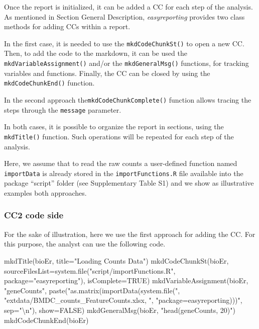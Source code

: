 \documentclass[
]{article}
\newenvironment{Shaded}{\begin{snugshade}}{\end{snugshade}}
\newcommand{\AttributeTok}[1]{\textcolor[rgb]{0.77,0.63,0.00}{#1}}
\newcommand{\ConstantTok}[1]{\textcolor[rgb]{0.00,0.00,0.00}{#1}}
\newcommand{\FunctionTok}[1]{\textcolor[rgb]{0.00,0.00,0.00}{#1}}
\newcommand{\NormalTok}[1]{#1}
\newcommand{\SpecialCharTok}[1]{\textcolor[rgb]{0.00,0.00,0.00}{#1}}
\newcommand{\StringTok}[1]{\textcolor[rgb]{0.31,0.60,0.02}{#1}}
\begin{document}
Once the report is initialized, it can be added a CC for each step of
the analysis. As mentioned in Section General Description,
\emph{easyreporting} provides two class methods for adding CCs within a
report.

In the first case, it is needed to use the \texttt{mkdCodeChunkSt()} to
open a new CC. Then, to add the code to the markdown, it can be used the
\texttt{mkdVariableAssignment()} and/or the \texttt{mkdGeneralMsg()}
functions, for tracking variables and functions. Finally, the CC can be
closed by using the \texttt{mkdCodeChunkEnd()} function.

In the second approach the\texttt{mkdCodeChunkComplete()} function
allows tracing the steps through the \texttt{message} parameter.

In both cases, it is possible to organize the report in sections, using
the \texttt{mkdTitle()} function. Such operations will be repeated for
each step of the analysis.

Here, we assume that to read the raw counts a user-defined function
named \texttt{importData} is already stored in the
\texttt{importFunctions.R} file available into the package ``script''
folder (see Supplementary Table S1) and we show as illustrative examples
both approaches.

\hypertarget{cc2-code-side}{%
\subsubsection{CC2 code side}\label{cc2-code-side}}

For the sake of illustration, here we use the first approach for adding
the CC. For this purpose, the analyst can use the following code.

\begin{Shaded}
\begin{Highlighting}[]
\FunctionTok{mkdTitle}\NormalTok{(bioEr, }\AttributeTok{title=}\StringTok{"Loading Counts Data"}\NormalTok{)}
\FunctionTok{mkdCodeChunkSt}\NormalTok{(bioEr, }\AttributeTok{sourceFilesList=}\FunctionTok{system.file}\NormalTok{(}\StringTok{"script/importFunctions.R"}\NormalTok{, }
                                    \AttributeTok{package=}\StringTok{"easyreporting"}\NormalTok{), }\AttributeTok{isComplete=}\ConstantTok{TRUE}\NormalTok{)}
\FunctionTok{mkdVariableAssignment}\NormalTok{(bioEr, }\StringTok{"geneCounts"}\NormalTok{, }\FunctionTok{paste}\NormalTok{(}\StringTok{"as.matrix(importData(system.file(\textquotesingle{}"}\NormalTok{,}
                            \StringTok{"extdata/BMDC\_counts\_FeatureCounts.xlsx\textquotesingle{}, "}\NormalTok{,}
                            \StringTok{"package=\textquotesingle{}easyreporting\textquotesingle{})))"}\NormalTok{, }\AttributeTok{sep=}\StringTok{"}\SpecialCharTok{\textbackslash{}n}\StringTok{"}\NormalTok{), }\AttributeTok{show=}\ConstantTok{FALSE}\NormalTok{)}
\FunctionTok{mkdGeneralMsg}\NormalTok{(bioEr, }\StringTok{"head(geneCounts, 20)"}\NormalTok{)}
\FunctionTok{mkdCodeChunkEnd}\NormalTok{(bioEr)}
\end{Highlighting}
\end{Shaded}
\end{document}
